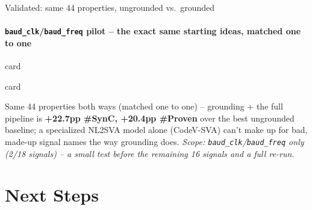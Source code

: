 \documentclass[aspectratio=169]{beamer}
\newenvironment{card}[1][\textwidth]{%
  \begin{beamercolorbox}[wd=#1,sep=8pt,rounded=true,shadow=false]{card}
}{%
  \end{beamercolorbox}
}
\begin{document}
\begin{frame}{Validated: same 44 properties, ungrounded vs.\ grounded}
  \framesubtitle{\texttt{baud\_clk}/\texttt{baud\_freq} pilot -- the exact same starting ideas, matched one to one}
  \begin{card}
  \centering
  \renewcommand{\arraystretch}{1.3}
  \end{card}
  \vspace{5pt}
  \begin{card}
    \scriptsize
    Same 44 properties both ways (matched one to one) -- grounding + the
    full pipeline is \textbf{+22.7pp \#SynC, +20.4pp \#Proven} over the best
    ungrounded baseline; a specialized NL2SVA model alone (CodeV-SVA)
    can't make up for bad, made-up signal names the way grounding
    does. \textit{Scope: \texttt{baud\_clk}/\texttt{baud\_freq} only (2/18
    signals) -- a small test before the remaining 16 signals and a full
    re-run.}
  \end{card}
\end{frame}

\section{Next Steps}
\end{document}
